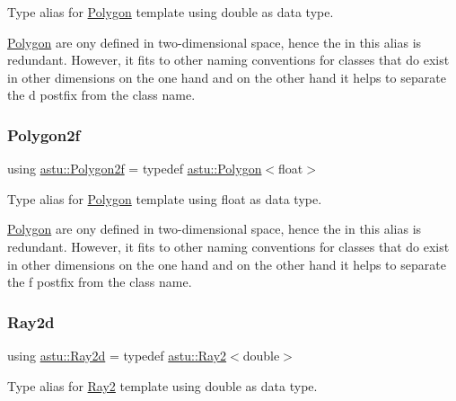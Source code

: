 Type alias for \hyperlink{classastu_1_1Polygon}{Polygon} template using double as data type.

\hyperlink{classastu_1_1Polygon}{Polygon} are ony defined in two-\/dimensional space, hence the {} in this alias is redundant. However, it fits to other naming conventions for classes that do exist in other dimensions on the one hand and on the other hand it helps to separate the {\ttfamily d} postfix from the class name. \mbox{\label{group__math__group_ga39ca0cd425ff5edd2a090d6997ce8c2a}} 
\subsubsection{\texorpdfstring{Polygon2f}{Polygon2f}}
{\footnotesize\ttfamily using \hyperlink{group__math__group_ga39ca0cd425ff5edd2a090d6997ce8c2a}{astu\+::\+Polygon2f} = typedef \hyperlink{classastu_1_1Polygon}{astu\+::\+Polygon}$<$float$>$}

Type alias for \hyperlink{classastu_1_1Polygon}{Polygon} template using float as data type.

\hyperlink{classastu_1_1Polygon}{Polygon} are ony defined in two-\/dimensional space, hence the {} in this alias is redundant. However, it fits to other naming conventions for classes that do exist in other dimensions on the one hand and on the other hand it helps to separate the {\ttfamily f} postfix from the class name. \mbox{\label{group__math__group_ga37ce0df4f800cdda11a64fa7d936a25d}} 
\subsubsection{\texorpdfstring{Ray2d}{Ray2d}}
{\footnotesize\ttfamily using \hyperlink{group__math__group_ga37ce0df4f800cdda11a64fa7d936a25d}{astu\+::\+Ray2d} = typedef \hyperlink{classastu_1_1Ray2}{astu\+::\+Ray2}$<$double$>$}

Type alias for \hyperlink{classastu_1_1Ray2}{Ray2} template using double as data type. \mbox{\label{group__math__group_gaa8986be7101408a7fbfdd07c73ecf8cb}} 
